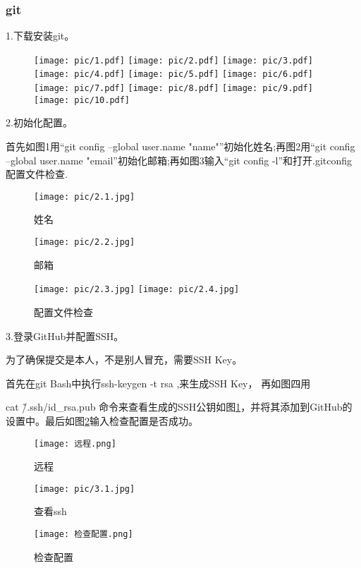 \documentclass[a4paper]{article}
\begin{document}
\subsubsection{git}
1.下载安装git。
\begin{figure}[h] 
    \texttt{[image: pic/1.pdf]}
     \texttt{[image: pic/2.pdf]}
     \texttt{[image: pic/3.pdf]}
      \texttt{[image: pic/4.pdf]}
       \texttt{[image: pic/5.pdf]}
    \texttt{[image: pic/6.pdf]}
    \texttt{[image: pic/7.pdf]}
     \texttt{[image: pic/8.pdf]}
    \texttt{[image: pic/9.pdf]}
    \texttt{[image: pic/10.pdf]}
    
\end{figure} 
\hfill

2.初始化配置。

首先如图1用“git config --global user.name "name"”初始化姓名;再图2用“git config --global user.name "email”初始化邮箱;再如图3输入“git config -l”和打开.gitconfig配置文件检查.

\begin{figure}[h] 
\centering
    \texttt{[image: pic/2.1.jpg]}
    \caption{姓名}
    \texttt{[image: pic/2.2.jpg]}
    \caption{邮箱}
    \texttt{[image: pic/2.3.jpg]}
    \texttt{[image: pic/2.4.jpg]}
    \caption{配置文件检查}
\end{figure} 
\vspace{2cm}
3.登录GitHub并配置SSH。

为了确保提交是本人，不是别人冒充，需要SSH Key。

首先在git Bash中执行ssh-keygen -t rsa ,来生成SSH Key，  
再如图四用 

cat \~/.ssh/id\_rsa.pub  
命令来查看生成的SSH公钥如图\ref{远程}，并将其添加到GitHub的设置中。最后如图\ref{检查配置}输入检查配置是否成功。
\begin{figure}[h]
    \centering
    \texttt{[image: 远程.png]}
    \caption{远程}
    \label{远程}
\end{figure}
\begin{figure}[h]
    \centering
    \texttt{[image: pic/3.1.jpg]}
\caption{查看ssh}
    \texttt{[image: 检查配置.png]}
    \caption{检查配置}
    \label{检查配置}
\end{figure}
\end{document}
